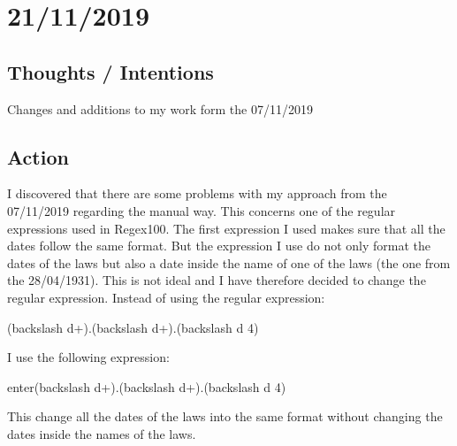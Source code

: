 \documentclass{article}
\begin{document}
\newpage
\section{21/11/2019}

\subsection{Thoughts / Intentions}
Changes and additions to my work form the 07/11/2019

\subsection{Action}
I discovered that there are some problems with my approach from the 07/11/2019 regarding the manual way. This concerns one of the regular expressions used in Regex100. The first expression I used makes sure that all the dates follow the same format. But the expression I use do not only format the dates of the laws but also a date inside the name of one of the laws (the one from the 28/04/1931). This is not ideal and I have therefore decided to change the regular expression. Instead of using the regular expression:
\begin{center} (backslash d+).(backslash d+).(backslash d {4}) 
\end{center}
I use the following expression:
\begin{center} enter(backslash d+).(backslash d+).(backslash d {4})
\end{center}
This change all the dates of the laws into the same format without changing the dates inside the names of the laws.
\end{document}
